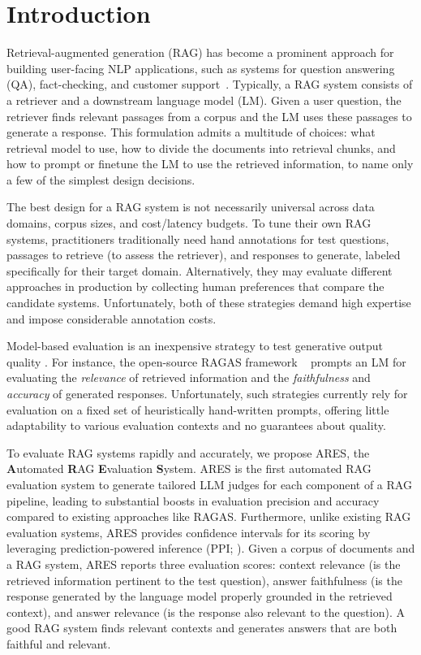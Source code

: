 
\section{Introduction}

Retrieval-augmented generation (RAG) has become a prominent approach for building user-facing NLP applications, such as systems for question answering (QA), fact-checking, and customer support~\cite{petroni-etal-2021-kilt, wang2019superglue}. Typically, a RAG system consists of a retriever and a downstream language model (LM). Given a user question, the retriever finds relevant passages from a corpus 
and the LM uses these passages to generate a response. This formulation admits a multitude of choices: 
what retrieval model to use, %
how to divide the documents into retrieval chunks, %
and how to prompt %
or finetune %
the LM to use the retrieved information, to name only a few of the simplest design decisions.

The best design for a RAG system is not necessarily universal across data domains, corpus sizes, and cost/latency budgets. To tune their own RAG systems, practitioners traditionally need hand annotations for test questions, passages to retrieve (to assess the retriever), and responses to generate, labeled specifically for their target domain. Alternatively, they may evaluate different approaches in production by collecting human preferences that compare the candidate systems. Unfortunately, both of these strategies demand high expertise and impose considerable annotation costs.

Model-based evaluation is
an inexpensive
strategy to test generative output quality \cite{zheng2023judging}. For instance, the open-source RAGAS framework ~\cite{ragas2023} prompts an LM for evaluating the \textit{relevance} of retrieved information and the \textit{faithfulness} and \textit{accuracy} of generated responses. Unfortunately, such strategies currently rely for evaluation on a fixed set of heuristically hand-written prompts, offering little adaptability to various evaluation contexts and no guarantees about quality. %






To evaluate RAG systems rapidly and accurately, we propose ARES, the \textbf{A}utomated \textbf{R}AG \textbf{E}valuation \textbf{S}ystem.
ARES is the first automated RAG evaluation system to generate tailored LLM judges for each component of a RAG pipeline, leading to substantial boosts in evaluation precision and accuracy compared to existing approaches like RAGAS.
Furthermore, unlike existing RAG evaluation systems, ARES provides 
confidence intervals for its scoring
by leveraging prediction-powered inference (PPI; \citealt{angelopoulos2023predictionpowered}).
Given a corpus of documents and a RAG system, ARES reports three evaluation scores: context relevance (is the retrieved information pertinent to the test question), answer faithfulness (is the response generated by the language model properly grounded in the retrieved context), and answer relevance (is the response also relevant to the question). A good RAG system finds relevant contexts and generates answers that are both faithful and relevant.


